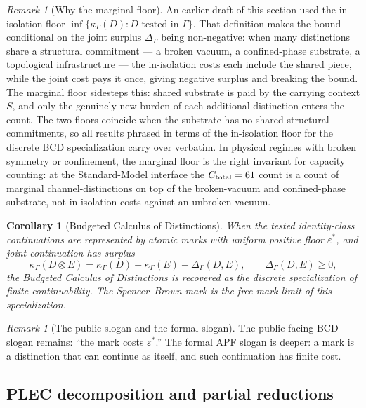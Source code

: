 \documentclass[11pt]{article}
\newtheorem{corollary}[theorem]{Corollary}
\theoremstyle{remark}
\newtheorem{remark}[theorem]{Remark}
\newcommand{\G}{\Gamma}
\newcommand{\Cost}{\kappa}
\newcommand{\eps}{\varepsilon^{\!*}}
\begin{document}
\begin{remark}[Why the marginal floor]
An earlier draft of this section used the in-isolation floor $\inf\{\Cost_\G(D):D\text{ tested in }\G\}$.  That definition makes the bound conditional on the joint surplus $\Delta_\G$ being non-negative: when many distinctions share a structural commitment --- a broken vacuum, a confined-phase substrate, a topological infrastructure --- the in-isolation costs each include the shared piece, while the joint cost pays it once, giving negative surplus and breaking the bound.  The marginal floor sidesteps this: shared substrate is paid by the carrying context $S$, and only the genuinely-new burden of each additional distinction enters the count.  The two floors coincide when the substrate has no shared structural commitments, so all results phrased in terms of the in-isolation floor for the discrete BCD specialization carry over verbatim.  In physical regimes with broken symmetry or confinement, the marginal floor is the right invariant for capacity counting: at the Standard-Model interface the $C_{\rm total}=61$ count is a count of marginal channel-distinctions on top of the broken-vacuum and confined-phase substrate, not in-isolation costs against an unbroken vacuum.
\end{remark}

\begin{corollary}[Budgeted Calculus of Distinctions]
When the tested identity-class continuations are represented by atomic marks with uniform positive floor \(\eps\), and joint continuation has surplus
\[
        \Cost_\G(D\otimes E)
        =
        \Cost_\G(D)+\Cost_\G(E)+\Delta_\G(D,E),
        \qquad \Delta_\G(D,E)\ge0,
\]
the Budgeted Calculus of Distinctions is recovered as the discrete specialization of finite continuability.  The Spencer--Brown mark is the free-mark limit of this specialization.
\end{corollary}

\begin{remark}[The public slogan and the formal slogan]
The public-facing BCD slogan remains: ``the mark costs \(\eps\).''  The formal APF slogan is deeper: a mark is a distinction that can continue as itself, and such continuation has finite cost.
\end{remark}

\subsection{PLEC decomposition and partial reductions}\label{sec:plec-recovery}
\end{document}
